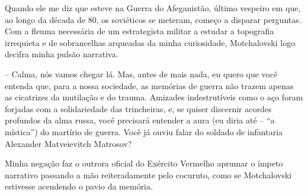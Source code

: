 Quando ele me diz que esteve na Guerra do Afeganistão, último vespeiro
em que, ao longo da década de 80, os soviéticos se meteram, começo a
disparar perguntas. Com a fleuma necessária de um estrategista militar a
estudar a topografia irrequieta e de sobrancelhas arqueadas da minha
curiosidade, Motchalovski logo decifra minha pulsão narrativa.

-- Calma, nós vamos chegar lá. Mas, antes de mais nada, eu quero que
você entenda que, para a nossa sociedade, as memórias de guerra não
trazem apenas as cicatrizes da mutilação e do trauma. Amizades
indestrutíveis como o aço foram forjadas com a solidariedade das
trincheiras, e, se quiser discernir acordes profundos da alma russa,
você precisará entender a aura (eu diria até -- ``a mística'') do
martírio de guerra. Você já ouviu falar do soldado de infantaria
Alexander Matveievitch Matrosov?

Minha negação faz o outrora oficial do Exército Vermelho aprumar o
ímpeto narrativo passando a mão reiteradamente pelo cocuruto, como se
Motchalovski estivesse acendendo o pavio da memória.

